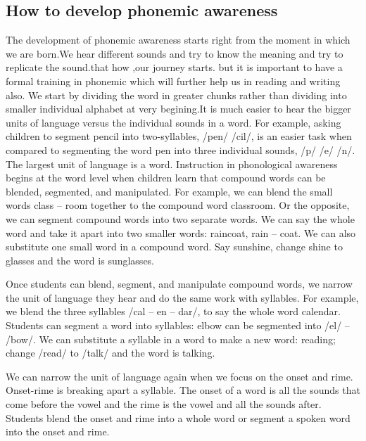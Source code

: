 \subsection{How to develop phonemic awareness}

The development of phonemic awareness starts right from the moment in which we are born.We hear different sounds and try to know the meaning and try to replicate the sound.that how ,our journey starts. but it is important to have a formal training in phonemic which will further help us in reading and writing also.
We start by dividing the word in greater chunks rather than dividing into smaller individual alphabet at very begining.It is much easier to hear the bigger units of language versus the individual sounds in a word. For example, asking children to segment pencil into two-syllables, /pen/ /cil/, is an easier task when compared to segmenting the word pen into three individual sounds, /p/ /e/ /n/.
The largest unit of language is a word.  Instruction in phonological awareness begins at the word level when children learn that compound words can be blended, segmented, and manipulated. For example, we can blend the small words class – room together to the compound word classroom. Or the opposite, we can segment compound words into two separate words. We can say the whole word and take it apart into two smaller words:  raincoat, rain – coat.  We can also substitute one small word in a compound word. Say sunshine, change shine to glasses and the word is sunglasses.

Once students can blend, segment, and manipulate compound words, we narrow the unit of language they hear and do the same work with syllables. For example, we blend the three syllables /cal – en – dar/, to say the whole word calendar.  Students can segment a word into syllables: elbow can be segmented into /el/ – /bow/.  We can substitute a syllable in a word to make a new word: reading; change /read/ to /talk/ and the word is talking.

We can narrow the unit of language again when we focus on the onset and rime. Onset-rime is breaking apart a syllable. The onset of a word is all the sounds that come before the vowel and the rime is the vowel and all the sounds after. Students blend the onset and rime into a whole word or segment a spoken word into the onset and rime.

